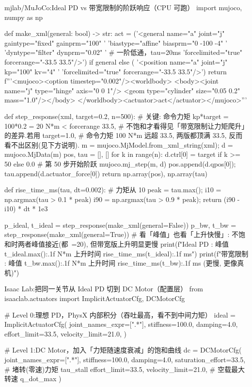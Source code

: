 \begin{codebox}[Python]{mjlab/MuJoCo:Ideal PD vs 带宽限制的阶跃响应（CPU 可跑）}
import mujoco, numpy as np

def make_xml(general: bool) -> str:
    act = ('<general name="a" joint="j" gaintype="fixed" gainprm="100" '
           'biastype="affine" biasprm="0 -100 -4" '
           'dyntype="filter" dynprm="0.02" '          # 一阶低通，tau=20ms
           'forcelimited="true" forcerange="-33.5 33.5"/>') if general else (
           '<position name="a" joint="j" kp="100" kv="4" '
           'forcelimited="true" forcerange="-33.5 33.5"/>')
    return f'''<mujoco><option timestep="0.002"/><worldbody>
      <body><joint name="j" type="hinge" axis="0 0 1"/>
      <geom type="cylinder" size="0.05 0.2" mass="1.0"/></body>
      </worldbody><actuator>{act}</actuator></mujoco>'''

def step_response(xml, target=0.2, n=500):
    # 关键: 命令力矩 kp*target = 100*0.2 = 20 N*m < forcerange 33.5,
    # 不饱和才看得见「带宽限制让力矩爬升」的差异.若用 target=1.0,
    # 命令力矩 100 N*m 远超 33.5, 两版都顶满 33.5, 反而看不出区别(见下方说明).
    m = mujoco.MjModel.from_xml_string(xml); d = mujoco.MjData(m)
    pos, tau = [], []
    for k in range(n):
        d.ctrl[0] = target if k >= 50 else 0.0   # 第 50 步开始阶跃
        mujoco.mj_step(m, d)
        pos.append(d.qpos[0]); tau.append(d.actuator_force[0])
    return np.array(pos), np.array(tau)

def rise_time_ms(tau, dt=0.002):           # 力矩从 10%
    peak = tau.max(); i10 = np.argmax(tau > 0.1 * peak)
    i90 = np.argmax(tau > 0.9 * peak); return (i90 - i10) * dt * 1e3

p_ideal, t_ideal = step_response(make_xml(general=False))
p_bw,    t_bw    = step_response(make_xml(general=True))
# 看「峰值」也看「上升快慢」: 不饱和时两者峰值接近(都~=20), 但带宽版上升明显更慢
print(f"Ideal PD : 峰值 {t_ideal.max():.1f} N*m  上升时间 {rise_time_ms(t_ideal):.1f} ms")
print(f"带宽限制 : 峰值 {t_bw.max():.1f} N*m  上升时间 {rise_time_ms(t_bw):.1f} ms (更慢, 更像真机)")
\end{codebox}

\begin{codebox}[Python]{Isaac Lab:把同一关节从 Ideal PD 切到 DC Motor（配置层）}
from isaaclab.actuators import ImplicitActuatorCfg, DCMotorCfg

# Level 0:理想 PD，PhysX 内部积分（吞吐最高，看不到中间力矩）
ideal = ImplicitActuatorCfg(
    joint_names_expr=[".*"], stiffness=100.0, damping=4.0,
    effort_limit=33.5, velocity_limit=21.0,
)

# Level 1:DC Motor，加入「力矩随速度衰减」的饱和曲线
dc = DCMotorCfg(
    joint_names_expr=[".*"], stiffness=100.0, damping=4.0,
    saturation_effort=33.5,   # 堵转(零速)力矩 tau_stall
    effort_limit=33.5, velocity_limit=21.0,   # 空载最大转速 q_dot_max
)
\end{codebox}

